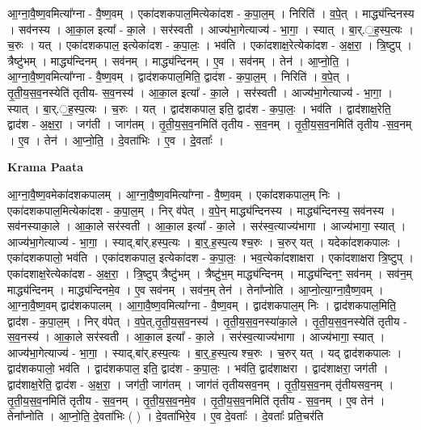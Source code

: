 \documentclass[17pt]{extarticle}
\begin{document}
आ॒ग्ना॒वै॒ष्ण॒वमित्या᳚ग्ना - वै॒ष्ण॒वम् । एका॑दशकपाल॒मित्येका॑दश - क॒पा॒ल॒म् । निरिति॑ । व॒पे॒त् । माद्ध्य॑न्दिनस्य । सव॑नस्य । आ॒का॒ल इत्या᳚ - का॒ले । सर॑स्वती । आज्य॑भा॒गेत्याज्य॑ - भा॒गा॒ । स्यात् । बा॒र्.॒ह॒स्प॒त्यः । च॒रुः । यत् । एका॑दशकपाल॒ इत्येका॑दश - क॒पा॒लः॒ । भव॑ति । एका॑दशाक्ष॒रेत्येका॑दश - अ॒क्ष॒रा॒ । त्रि॒ष्टुप् । त्रैष्टु॑भम् । माद्ध्य॑न्दिनम् । सव॑नम् । माद्ध्य॑न्दिनम् । ए॒व । सव॑नम् । तेन॑ । आ॒प्नो॒ति॒ । आ॒ग्ना॒वै॒ष्ण॒वमित्या᳚ग्ना - वै॒ष्ण॒वम् । द्वाद॑शकपाल॒मिति॒ द्वाद॑श - क॒पा॒ल॒म् । निरिति॑ । व॒पे॒त् । तृ॒ती॒य॒स॒व॒नस्येति॑ तृतीय- स॒व॒नस्य॑ । आ॒का॒ल इत्या᳚ - का॒ले । सर॑स्वती । आज्य॑भा॒गेत्याज्य॑ - भा॒गा॒ । स्यात् । बा॒र्.॒ह॒स्प॒त्यः । च॒रुः । यत् । द्वाद॑शकपाल॒ इति॒ द्वाद॑श - क॒पा॒लः॒ । भव॑ति । द्वाद॑शाक्ष॒रेति॒ द्वाद॑श - अ॒क्ष॒रा॒ । जग॑ती । जाग॑तम् । तृ॒ती॒य॒स॒व॒नमिति॑ तृतीय - स॒व॒नम् । तृ॒ती॒य॒स॒व॒नमिति॑ तृतीय -स॒व॒नम् । ए॒व । तेन॑ । आ॒प्नो॒ति॒ । दे॒वता॑भिः । ए॒व । दे॒॒वताः᳚ ।  \newline


\textbf{Krama Paata} \newline

आ॒ग्ना॒वै॒ष्ण॒वमेका॑दशकपालम् । आ॒ग्ना॒वै॒ष्ण॒वमित्या᳚ग्ना - वै॒ष्ण॒वम् । एका॑दशकपाल॒म् निः । एका॑दशकपाल॒मित्येका॑दश - क॒पा॒ल॒म् । निर् व॑पेत् । व॒पे॒न् माद्ध्य॑न्दिनस्य । माद्ध्य॑न्दिनस्य॒ सव॑नस्य । सव॑नस्याका॒ले । आ॒का॒ले सर॑स्वती । आ॒का॒ल इत्या᳚ - का॒ले । सर॑स्व॒त्याज्य॑भागा । आज्य॑भागा॒ स्यात् । आज्य॑भा॒गेत्याज्य॑ - भा॒गा॒ । स्याद्,बा॑र्.हस्प॒त्यः । बा॒र्॒.ह॒स्प॒त्य श्च॒रुः । च॒रुर् यत् । यदेका॑दशकपालः । एका॑दशकपालो॒ भव॑ति । एका॑दशकपाल॒ इत्येका॑दश - क॒पा॒लः॒ । भव॒त्येका॑दशाक्षरा । एका॑दशाक्षरा त्रि॒ष्टुप् । एका॑दशाक्ष॒रेत्येका॑दश - अ॒क्ष॒रा॒ । त्रि॒ष्टुप् त्रैष्टु॑भम् । त्रैष्टु॑भ॒म् माद्ध्य॑न्दिनम् । माद्ध्य॑न्दिनꣳ॒॒ सव॑नम् । सव॑न॒म् माद्ध्य॑न्दिनम् । माद्ध्य॑न्दिनमे॒व । ए॒व सव॑नम् । सव॑न॒म् तेन॑ । तेना᳚प्नोति । आ॒प्नो॒त्या॒ग्ना॒वै॒ष्ण॒वम् । आ॒ग्ना॒वै॒ष्ण॒वम् द्वाद॑शकपालम् । आ॒गा॒वै॒ष्ण॒वमित्या᳚ग्ना - वै॒ष्ण॒वम् । द्वाद॑शकपाल॒म् निः । द्वाद॑शकपाल॒मिति॒ द्वाद॑श - क॒पा॒ल॒म् । निर् व॑पेत् । व॒पे॒त्,तृ॒ती॒य॒स॒व॒नस्य॑ । तृ॒ती॒य॒स॒व॒नस्या॑का॒ले । तृ॒ती॒य॒स॒व॒नस्येति॑ तृतीय - स॒व॒नस्य॑ । आ॒का॒ले सर॑स्वती । आ॒का॒ल इत्या᳚ - का॒ले । सर॑स्व॒त्याज्य॑भागा । आज्य॑भागा॒ स्यात् । आज्य॑भा॒गेत्याज्य॑ - भा॒गा॒ । स्याद्,बा॑र्.हस्प॒त्यः । बा॒र्॒.ह॒स्प॒त्य श्च॒रुः । च॒रुर् यत् । यद् द्वाद॑शकपालः । द्वाद॑शकपालो॒ भव॑ति । द्वाद॑शकपाल॒ इति॒ द्वाद॑श - क॒पा॒लः॒ । भव॑ति॒ द्वाद॑शाक्षरा । द्वाद॑शाक्षरा॒ जग॑ती । द्वाद॑शाक्ष॒रेति॒ द्वाद॑श - अ॒क्ष॒रा॒ । जग॑ती॒ जाग॑तम् । जाग॑तं तृतीयसव॒नम् । तृ॒ती॒य॒स॒व॒नम् तृ॑तीयसव॒नम् । तृ॒ती॒य॒स॒व॒नमिति॑ तृतीय - स॒व॒नम् । तृ॒ती॒य॒स॒व॒नमे॒व । तृ॒ती॒य॒स॒व॒नमिति॑ तृतीय - स॒व॒नम् । ए॒व तेन॑ । तेना᳚प्नोति । आ॒प्नो॒ति॒ दे॒वता॑भिः ( ) । दे॒वता॑भिरे॒व । ए॒व दे॒वताः᳚ । दे॒वताः᳚ प्रति॒चर॑ति \newline
\end{document}
